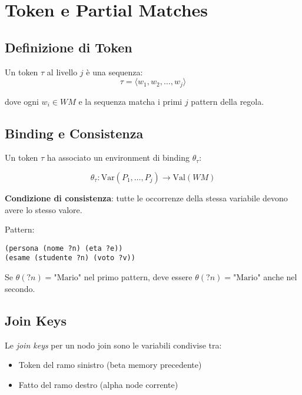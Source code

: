 \section{Token e Partial Matches}

\subsection{Definizione di Token}

\begin{definizione}[Token]
Un token $\tau$ al livello $j$ è una sequenza:
\begin{equation}
\tau = \langle w_1, w_2, \ldots, w_j \rangle
\end{equation}

dove ogni $w_i \in WM$ e la sequenza matcha i primi $j$ pattern della regola.
\end{definizione}

\subsection{Binding e Consistenza}

Un token $\tau$ ha associato un environment di binding $\theta_\tau$:

\begin{equation}
\theta_\tau: \text{Var}(P_1, \ldots, P_j) \to \text{Val}(WM)
\end{equation}

\textbf{Condizione di consistenza}: tutte le occorrenze della stessa variabile devono avere lo stesso valore.

\begin{esempio}
Pattern:
\begin{lstlisting}[language=CLIPS]
(persona (nome ?n) (eta ?e))
(esame (studente ?n) (voto ?v))
\end{lstlisting}

Se $\theta(?n) = \text{"Mario"}$ nel primo pattern, deve essere $\theta(?n) = \text{"Mario"}$ anche nel secondo.
\end{esempio}

\subsection{Join Keys}

\begin{definizione}
Le \textit{join keys} per un nodo join sono le variabili condivise tra:
\begin{itemize}
\item Token del ramo sinistro (beta memory precedente)
\item Fatto del ramo destro (alpha node corrente)
\end{itemize}
\end{definizione}

